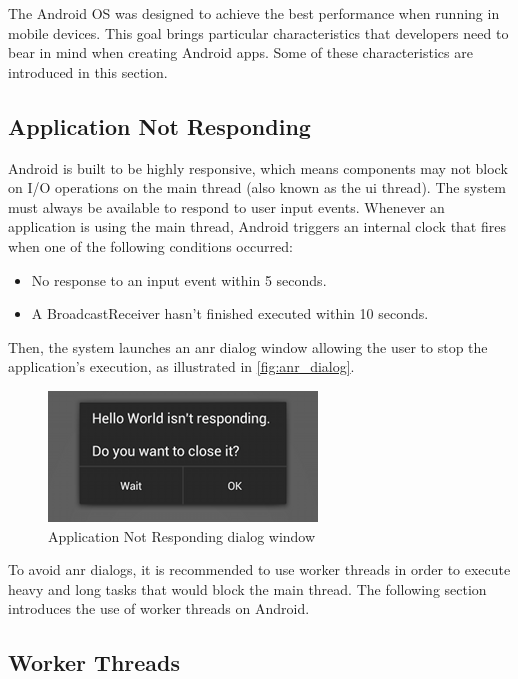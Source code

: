 The Android OS was designed to achieve the best performance when running in mobile devices. This goal brings particular characteristics that developers need to bear in mind when creating Android apps. Some of these characteristics are introduced in this section.

\subsection{Application Not Responding}

Android is built to be highly responsive, which means components may not block on I/O operations on the main thread (also known as the \gls{ui} thread). The system must always be available to respond to user input events. Whenever an application is using the main thread, Android triggers an internal clock that fires when one of the following conditions occurred:

\begin{itemize}
\item No response to an input event within 5 seconds.
\item A BroadcastReceiver hasn't finished executed within 10 seconds.
\end{itemize}

Then, the system launches an \gls{anr} dialog window allowing the user to stop the application's execution, as illustrated in \autoref{fig:anr_dialog}.

\begin{figure}[h]
 \centering
 \includegraphics[scale=0.5]{figures/anr_dialog.png}
 \caption{Application Not Responding dialog window}
 \label{fig:anr_dialog}
\end{figure}

To avoid \gls{anr} dialogs, it is recommended to use worker threads in order to execute heavy and long tasks that would block the main thread. The following section introduces the use of worker threads on Android.

\subsection{Worker Threads}

